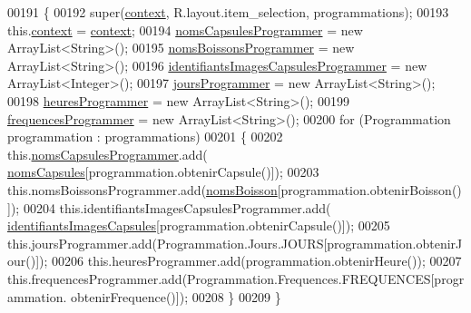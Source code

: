 \begin{DoxyCode}
00191         \{
00192             super(\hyperlink{classcom_1_1example_1_1ekawa_1_1_ihm_1_1_adaptateur_programmer_aa2573f7d985ef662075730cb36a80f8a}{context}, R.layout.item\_selection, programmations);
00193             this.\hyperlink{classcom_1_1example_1_1ekawa_1_1_ihm_1_1_adaptateur_programmer_aa2573f7d985ef662075730cb36a80f8a}{context} = \hyperlink{classcom_1_1example_1_1ekawa_1_1_ihm_1_1_adaptateur_programmer_aa2573f7d985ef662075730cb36a80f8a}{context};
00194             \hyperlink{classcom_1_1example_1_1ekawa_1_1_ihm_1_1_adaptateur_programmer_ae079ecc919f92004afb238e01bb53928}{nomsCapsulesProgrammer} = \textcolor{keyword}{new} ArrayList<String>();
00195             \hyperlink{classcom_1_1example_1_1ekawa_1_1_ihm_1_1_adaptateur_programmer_a6cf686ef8f8c82dee10e609c7544a8e6}{nomsBoissonsProgrammer} = \textcolor{keyword}{new} ArrayList<String>();
00196             \hyperlink{classcom_1_1example_1_1ekawa_1_1_ihm_1_1_adaptateur_programmer_a468b21b654bd1c5cc663e1abf34c62ba}{identifiantsImagesCapsulesProgrammer} = \textcolor{keyword}{new} 
      ArrayList<Integer>();
00197             \hyperlink{classcom_1_1example_1_1ekawa_1_1_ihm_1_1_adaptateur_programmer_a935bc1f05da276a491141ff78b66dad6}{joursProgrammer} = \textcolor{keyword}{new} ArrayList<String>();
00198             \hyperlink{classcom_1_1example_1_1ekawa_1_1_ihm_1_1_adaptateur_programmer_a114578f4eb2a34e7d3a258635c2ad9f1}{heuresProgrammer} = \textcolor{keyword}{new} ArrayList<String>();
00199             \hyperlink{classcom_1_1example_1_1ekawa_1_1_ihm_1_1_adaptateur_programmer_a877b83e1a28ac8f704052df39aad695e}{frequencesProgrammer} = \textcolor{keyword}{new} ArrayList<String>();
00200             \textcolor{keywordflow}{for} (Programmation programmation : programmations)
00201             \{
00202                 this.\hyperlink{classcom_1_1example_1_1ekawa_1_1_ihm_1_1_adaptateur_programmer_ae079ecc919f92004afb238e01bb53928}{nomsCapsulesProgrammer}.add(
      \hyperlink{classcom_1_1example_1_1ekawa_1_1_ihm_a9d61b7bfd998d449bb405dcf5e6e4e89}{nomsCapsules}[programmation.obtenirCapsule()]);
00203                 this.nomsBoissonsProgrammer.add(\hyperlink{classcom_1_1example_1_1ekawa_1_1_ihm_abafa700d1d1f943bd3e9678f698ed33a}{nomsBoisson}[programmation.obtenirBoisson()]);
00204                 this.identifiantsImagesCapsulesProgrammer.add(
      \hyperlink{classcom_1_1example_1_1ekawa_1_1_ihm_af35b42764d9f7b10c8bc0e210c3ba76d}{identifiantsImagesCapsules}[programmation.obtenirCapsule()]);
00205                 this.joursProgrammer.add(Programmation.Jours.JOURS[programmation.obtenirJour()]);
00206                 this.heuresProgrammer.add(programmation.obtenirHeure());
00207                 this.frequencesProgrammer.add(Programmation.Frequences.FREQUENCES[programmation.
      obtenirFrequence()]);
00208             \}
00209         \}
\end{DoxyCode}


